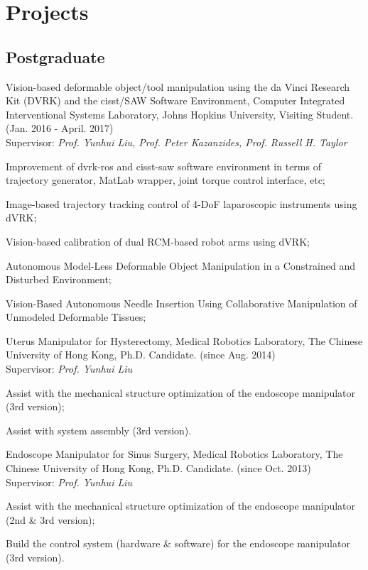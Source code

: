 \documentclass[10pt,letterpaper]{article}
\renewenvironment{itemize}{
\begin{list}{}{
    \setlength{\leftmargin}{1.5em}
    \setlength{\itemsep}{0.25em}
    \setlength{\parskip}{0pt}
    \setlength{\parsep}{0.25em}
    }
    }{
\end{list}
}
\begin{document}
\section*{Projects}

\subsection*{Postgraduate}
\begin{itemize}
    \item Vision-based deformable object/tool manipulation using the da Vinci Research Kit (DVRK) and the cisst/SAW Software Environment, Computer Integrated Interventional Systems Laboratory, Johns Hopkins University, Visiting Student. (Jan. 2016 - April. 2017) \\
    Supervisor: \textit{Prof. Yunhui Liu, Prof. Peter Kazanzides, Prof. Russell H. Taylor}
    \begin{itemize}
        \item Improvement of dvrk-ros and cisst-saw software environment in terms of trajectory generator, MatLab wrapper, joint torque control interface, etc;
        \item Image-based trajectory tracking control of 4-DoF laparoscopic instruments using dVRK;
        \item Vision-based calibration of dual RCM-based robot arms using dVRK;
        \item Autonomous Model-Less Deformable Object Manipulation in a Constrained and Disturbed Environment;
        \item Vision-Based Autonomous Needle Insertion Using Collaborative Manipulation of Unmodeled Deformable Tissues;
    \end{itemize}

    \item Uterus Manipulator for Hysterectomy, Medical Robotics Laboratory, The Chinese University of Hong Kong, Ph.D. Candidate. (since Aug. 2014) \\
    Supervisor: \textit{Prof. Yunhui Liu}
    \begin{itemize}
        \item Assist with the mechanical structure optimization of the endoscope manipulator (3rd version);
        \item Assist with system assembly (3rd version).
    \end{itemize}

    \item Endoscope Manipulator for Sinus Surgery, Medical Robotics Laboratory, The Chinese University of Hong Kong, Ph.D. Candidate. (since Oct. 2013) \\
    Supervisor: \textit{Prof. Yunhui Liu}
    \begin{itemize}
        \item Assist with the mechanical structure optimization of the endoscope manipulator (2nd \& 3rd version);
        \item Build the control system (hardware \& software) for the endoscope manipulator (3rd version).
    \end{itemize}


\end{itemize}
\end{document}
